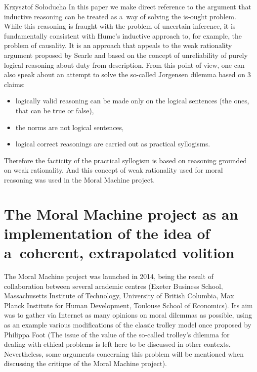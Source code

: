\begin{artengenv}{Krzysztof Sołoducha}
In this paper we make direct reference to the argument that inductive reasoning can be treated as a~way of solving the is-ought problem. While this reasoning is fraught with the problem of uncertain inference, it is fundamentally consistent with Hume's inductive approach to, for example, the problem of causality. It is an approach that appeals to the weak rationality argument proposed by Searle
\parencite*[][]{searle_how_1964} %
 and based on the concept of unreliability of purely logical reasoning about duty from description. From this point of view, one can also speak about an attempt to solve the so-called Jorgensen dilemma 
\parencite[][]{jorgensen_imperatives_1937} %
 based on 3 claims:
\begin{itemize}
%
%
%
\item logically valid reasoning can be made only on the logical sentences (the ones, that can be true or false),
\item the norms are not logical sentences,
\item logical correct reasonings are carried out as practical syllogisms.
\end{itemize}
Therefore the facticity of the practical syllogism is based on reasoning grounded on weak rationality. And this concept of weak rationality used for moral reasoning was used in the Moral Machine project.

\section*{The Moral Machine project as an implementation of the idea of a~coherent, extrapolated volition}
The Moral Machine project was launched in 2014, being the result of collaboration between several academic centres (Exeter Business School, Massachusetts Institute of Technology, University of British Columbia, Max Planck Institute for Human Development, Toulouse School of Economics). Its aim was to gather via Internet as many opinions on moral dilemmas as possible, using as an example various modifications of the classic trolley model once proposed by Philippa Foot (The issue of the value of the so-called trolley's dilemma for dealing with ethical problems is left here to be discussed in other contexts. Nevertheless, some arguments concerning this problem will be mentioned when discussing the critique of the Moral Machine project).


\end{artengenv}

